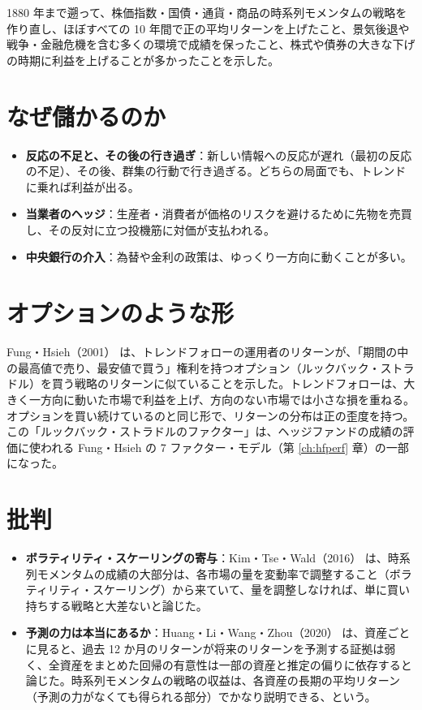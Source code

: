 \begin{paperbox}
1880 年まで遡って、株価指数・国債・通貨・商品の時系列モメンタムの戦略を作り直し、ほぼすべての 10 年間で正の平均リターンを上げたこと、景気後退や戦争・金融危機を含む多くの環境で成績を保ったこと、株式や債券の大きな下げの時期に利益を上げることが多かったことを示した。
\end{paperbox}

\section{なぜ儲かるのか}

\begin{itemize}
\item \textbf{反応の不足と、その後の行き過ぎ}：新しい情報への反応が遅れ（最初の反応の不足）、その後、群集の行動で行き過ぎる。どちらの局面でも、トレンドに乗れば利益が出る。
\item \textbf{当業者のヘッジ}：生産者・消費者が価格のリスクを避けるために先物を売買し、その反対に立つ投機筋に対価が支払われる。
\item \textbf{中央銀行の介入}：為替や金利の政策は、ゆっくり一方向に動くことが多い。
\end{itemize}

\section{オプションのような形}

Fung・Hsieh（2001）\cite{funghsieh2001} は、トレンドフォローの運用者のリターンが、「期間の中の最高値で売り、最安値で買う」権利を持つオプション（ルックバック・ストラドル）を買う戦略のリターンに似ていることを示した。トレンドフォローは、大きく一方向に動いた市場で利益を上げ、方向のない市場では小さな損を重ねる。オプションを買い続けているのと同じ形で、リターンの分布は正の歪度を持つ。この「ルックバック・ストラドルのファクター」は、ヘッジファンドの成績の評価に使われる Fung・Hsieh の 7 ファクター・モデル（第 \ref{ch:hfperf} 章）の一部になった。

\section{批判}

\begin{itemize}
\item \textbf{ボラティリティ・スケーリングの寄与}：Kim・Tse・Wald（2016）\cite{kimtsewald2016} は、時系列モメンタムの成績の大部分は、各市場の量を変動率で調整すること（ボラティリティ・スケーリング）から来ていて、量を調整しなければ、単に買い持ちする戦略と大差ないと論じた。
\item \textbf{予測の力は本当にあるか}：Huang・Li・Wang・Zhou（2020）\cite{hlwz2020} は、資産ごとに見ると、過去 12 か月のリターンが将来のリターンを予測する証拠は弱く、全資産をまとめた回帰の有意性は一部の資産と推定の偏りに依存すると論じた。時系列モメンタムの戦略の収益は、各資産の長期の平均リターン（予測の力がなくても得られる部分）でかなり説明できる、という。
\end{itemize}

